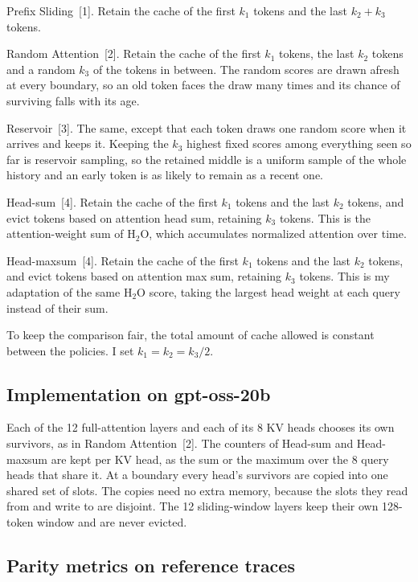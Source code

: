 \documentclass[10pt,letterpaper]{article}
\newcommand{\term}[1]{{\fontseries{b}\selectfont #1}}
\begin{document}
\term{Prefix Sliding}~[1]. Retain the cache of the first $k_1$ tokens and the last $k_2 + k_3$ tokens.

\term{Random Attention}~[2]. Retain the cache of the first $k_1$ tokens, the last $k_2$ tokens and a random $k_3$ of the tokens in between.
The random scores are drawn afresh at every boundary, so an old token faces the draw many times and its chance of surviving falls with its age.

\term{Reservoir}~[3]. The same, except that each token draws one random score when it arrives and keeps it.
Keeping the $k_3$ highest fixed scores among everything seen so far is reservoir sampling, so the retained middle is a uniform sample of the whole history and an early token is as likely to remain as a recent one.

\term{Head-sum}~[4]. Retain the cache of the first $k_1$ tokens and the last $k_2$ tokens, and evict tokens based on attention head sum, retaining $k_3$ tokens.
This is the attention-weight sum of H$_2$O, which accumulates normalized attention over time.

\term{Head-maxsum}~[4]. Retain the cache of the first $k_1$ tokens and the last $k_2$ tokens, and evict tokens based on attention max sum, retaining $k_3$ tokens.
This is my adaptation of the same H$_2$O score, taking the largest head weight at each query instead of their sum.

To keep the comparison fair, the total amount of cache allowed is constant between the policies.
I set $k_1 = k_2 = k_3/2$.

\subsection{Implementation on gpt-oss-20b}

Each of the 12 full-attention layers and each of its 8 KV heads chooses its own survivors, as in Random Attention~[2].
The counters of Head-sum and Head-maxsum are kept per KV head, as the sum or the maximum over the 8 query heads that share it.
At a boundary every head's survivors are copied into one shared set of slots.
The copies need no extra memory, because the slots they read from and write to are disjoint.
The 12 sliding-window layers keep their own 128-token window and are never evicted.

\subsection{Parity metrics on reference traces}
\end{document}

